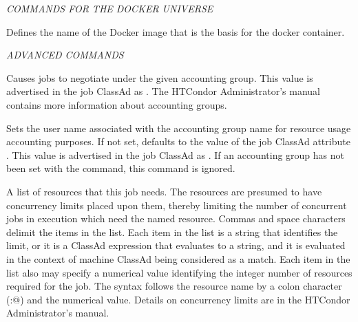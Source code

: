 \emph{COMMANDS FOR THE DOCKER UNIVERSE}
\begin{description} 


\label{condor-submit-docker-image}
\item[docker\_image = $<$ image-name $>$] Defines the name of the Docker
image that is the basis for the docker container.

\end{description} 

\emph{ADVANCED COMMANDS}
\begin{description} 


\label{condor-submit-accounting-group}
\item[accounting\_group = $<$accounting-group-name$>$] 
Causes jobs to negotiate under the given accounting group.  
This value is advertised in the job ClassAd as .
The HTCondor Administrator's manual  contains more information about 
accounting groups.


\label{condor-submit-accounting-group-user}
\item[accounting\_group\_user = $<$accounting-group-user-name$>$] 
Sets the user name associated with the accounting group name for 
resource usage accounting purposes.  If not set, 
defaults to the value of the job ClassAd attribute .
This value is
advertised in the job ClassAd as .
If an accounting group has not been set with the 
 command, 
this command is ignored.

\label{condor-submit-concurrency-limits}
\item[concurrency\_limits = $<$string-list$>$]
A list of resources that this job needs.
The resources are presumed to have concurrency limits placed upon them,
thereby limiting the number of concurrent jobs in execution which
need the named resource.
Commas and space characters delimit the items in the list.
Each item in the list is a string that identifies the limit,
or it is a ClassAd expression that evaluates to a string, 
and it is evaluated in the context of machine ClassAd 
being considered as a match.
Each item in the list also may specify a numerical value identifying the 
integer number of resources required for the job.
The syntax follows the resource name by a colon character (\verb@:@)
and the numerical value.
Details on concurrency limits are in the HTCondor Administrator's manual.


\end{description}
